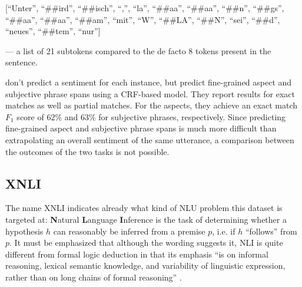 [``Unter'', ``\#\#ird'', ``\#\#isch'', ``,'', ``la'', ``\#\#aa'', ``\#\#aa'', ``\#\#n'', ``\#\#gs'', ``\#\#aa'', ``\#\#aa'', ``\#\#am'', ``mit'', ``W'', ``\#\#LA'', ``\#\#N'', ``sei'', ``\#\#d'', ``neues'', ``\#\#tem'', ``nur'']

--- a list of 21 subtokens compared to the de facto 8 tokens present in the sentence.










\cite{sanger2016scare} don't predict a sentiment for each instance, but predict fine-grained
aspect and subjective phrase spans using a CRF-based model.
They report results for exact matches as well as partial matches.
For the aspects, they achieve an exact match $F_1$ score of 62\% and 63\% for subjective phrases, respectively.
Since predicting fine-grained aspect and subjective phrase spans is much more difficult than
extrapolating an overall sentiment of the same utterance, a comparison between the outcomes of the
two tasks is not possible.


\subsection{XNLI}

The name XNLI indicates already what kind of NLU problem this dataset is targeted at:
\textbf{N}atural \textbf{L}anguage \textbf{I}nference is the task of determining whether
a hypothesis $h$ can reasonably be inferred from a premise $p$, i.e. if $h$ ``follows''
from $p$. It must be emphasized that although the wording suggests it, NLI is quite
different from formal logic deduction in that its emphasis ``is on informal reasoning,
lexical semantic knowledge, and variability of linguistic expression, rather than on
long chains of formal reasoning'' \citep{maccartney2009natural}.


